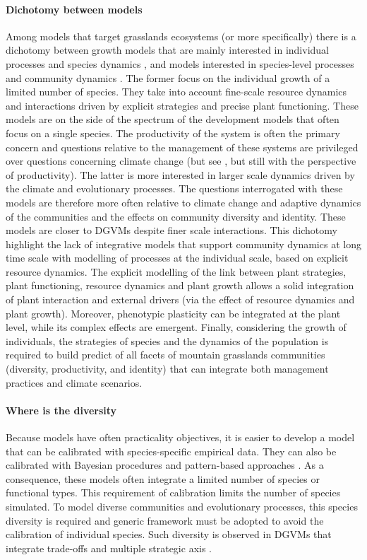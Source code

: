 \paragraph{Dichotomy between models}
Among models that target grasslands ecosystems (or more specifically) there is a dichotomy between growth models that are mainly interested in individual processes and species dynamics \cite{soussana_gemini:_2012, taubert_modelling_2014, lohier_analyse_2016}, and models interested in species-level processes and community dynamics \parencite{boulangeat_fate-dh_2014, cotto_dynamic_2017}. The former focus on the individual growth of a limited number of species. They take into account fine-scale resource dynamics and interactions driven by explicit strategies and precise plant functioning. These models are on the side of the spectrum of the development models that often focus on a single species. The productivity of the system is often the primary concern and questions relative to the management of these systems are privileged over questions concerning climate change (but see \cite{rodriguez_lingra-cc:_1999}, but still with the perspective of productivity). The latter is more interested in larger scale dynamics driven by the climate and evolutionary processes. The questions interrogated with these models are therefore more often relative to climate change and adaptive dynamics of the communities and the effects on community diversity and identity. These models are closer to DGVMs despite finer scale interactions. This dichotomy highlight the lack of integrative models that support community dynamics at long time scale with modelling of processes at the individual scale, based on explicit resource dynamics. The explicit modelling of the link between plant strategies, plant functioning, resource dynamics and plant growth allows a solid integration of plant interaction and external drivers (via the effect of resource dynamics and plant growth). Moreover, phenotypic plasticity can be integrated at the plant level, while its complex effects are emergent. Finally, considering the growth of individuals, the strategies of species and the dynamics of the population is required to build predict of all facets of mountain grasslands communities (diversity, productivity, and identity) that can integrate both management practices and climate scenarios.

\paragraph{Where is the diversity}
Because models have often practicality objectives, it is easier to develop a model that can be calibrated with species-specific empirical data. They can also be calibrated with Bayesian procedures and pattern-based approaches \cite{hartig_statistical_2011}. As a consequence, these models often integrate a limited number of species or functional types. This requirement of calibration limits the number of species simulated. To model diverse communities and evolutionary processes, this species diversity is required and generic framework must be adopted to avoid the calibration of individual species. Such diversity is observed in DGVMs that integrate trade-offs and multiple strategic axis \parencite{kleidon_global_20000, pavlick_jena_2013}.


